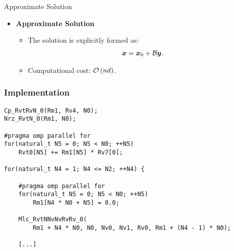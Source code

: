 \begin{frame}{Approximate Solution}
    \begin{itemize}
        \item \textbf{Approximate Solution}
        \begin{itemize}
            \item The solution is explicitly formed as:
            \begin{align}
                \bm{x} = \bm{x}_0 + \mathcal{B} \bm{y}.
            \end{align}
            \item Computational cost: $\mathcal{O} \left( n d \right)$.
        \end{itemize}
    \end{itemize}
\end{frame}

\begin{frame}[fragile] %
    \frametitle{Implementation}

\begin{lstlisting}[style=cpp]
Cp_RvtRvN_0(Rm1, Rv4, N0);
Nrz_RvtN_0(Rm1, N0);

#pragma omp parallel for
for(natural_t N5 = 0; N5 < N0; ++N5)
    Rvt0[N5] += Rm1[N5] * Rv7[0];

for(natural_t N4 = 1; N4 <= N2; ++N4) {

    #pragma omp parallel for
    for(natural_t N5 = 0; N5 < N0; ++N5)
        Rm1[N4 * N0 + N5] = 0.0;

    Mlc_RvtNNvNvRvRv_0(
        Rm1 + N4 * N0, N0, Nv0, Nv1, Rv0, Rm1 + (N4 - 1) * N0);

    [...]
\end{lstlisting}

\end{frame}

